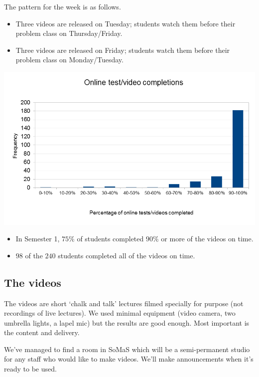 \documentclass[12pt,envcountsect]{beamer}
\theoremstyle{plain}
\theoremstyle{definition}
\begin{document}
\begin{frame}
The pattern for the week is as follows.\pause
\begin{itemize}
\item Three videos are released on Tuesday; \pause students watch them before their problem class on Thursday/Friday.\pause
\item Three videos are released on Friday; \pause students watch them before their problem class on Monday/Tuesday.
\end{itemize}
\end{frame}

\begin{frame}
\includegraphics[width=1\textwidth]{video_completions.png}

{\scriptsize
\begin{itemize}[<+->]
\item In Semester 1, $75\%$ of students completed $90\%$ or more of the videos on time.
\item $98$ of the $240$ students completed all of the videos on time.
\end{itemize}
}
\end{frame}

\subsection{The videos}

\begin{frame}
The videos are short `chalk and talk' lectures filmed specially for purpose \pause (not recordings of live lectures). \pause We used minimal equipment \pause (video camera, \pause two umbrella lights, \pause a lapel mic) \pause but the results are good enough. \pause Most important is the content and delivery.\pause

We've managed to find a room in SoMaS which will be a semi-permanent studio for any staff who would like to make videos. \pause We'll make announcements when it's ready to be used.
\end{frame}
\end{document}
